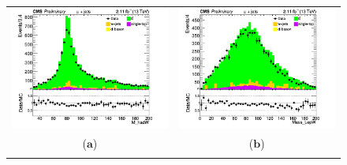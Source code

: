 \documentclass{cmspaper}
\begin{document}
\begin{figure}[htp]
\centering
\begin{tabular}{cc}
\hspace{-0.5cm}
\includegraphics[scale=0.40]{results/M_hadW.png}
& \hspace{-0.5cm} \includegraphics[scale=0.40]{results/mass_LepW.png}\\
   ($\mathbf{a}$)\qquad\qquad&($\mathbf{b}$)\qquad\qquad\qquad\\
\hspace{-0.5cm}

\end{tabular}
\end{figure}
\end{document}

